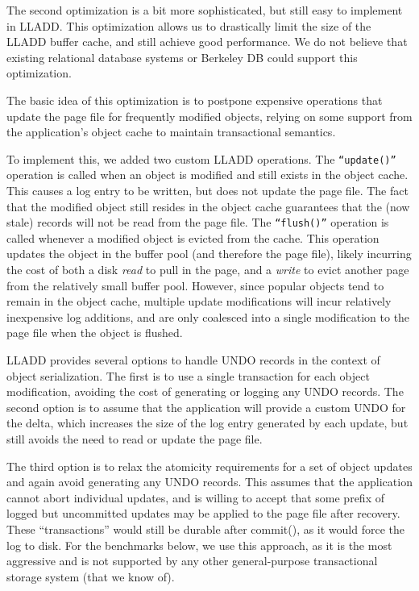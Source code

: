 \documentclass[10pt,letterpaper,twocolumn,english]{article}
\newcommand{\yad}{LLADD\xspace}
\begin{document}

The second optimization is a bit more sophisticated, but still easy to
implement in \yad.  This optimization allows us to drastically limit
the size of the
\yad buffer cache, and still achieve good performance.
We do not believe that existing relational database systems or Berkeley DB could support this optimization.

The basic idea of this optimization is to postpone expensive
operations that update the page file for frequently modified objects,
relying on some support from the application's object cache
to maintain transactional semantics.

To implement this, we added two custom \yad operations. The
{\tt``update()''} operation is called when an object is modified and
still exists in the object cache. This causes a log entry to be
written, but does not update the page file. The fact that the modified
object still resides in the object cache guarantees that the (now stale)
records will not be read from the page file. The {\tt ``flush()''}
operation is called whenever a modified object is evicted from the
cache. This operation updates the object in the buffer pool (and
therefore the page file), likely incurring the cost of both a disk {\em
read} to pull in the page, and a {\em write} to evict another page
from the relatively small buffer pool.  However, since popular 
objects tend to remain in the object cache, multiple update
modifications will incur relatively inexpensive log additions,
and are only coalesced into a single modification to the page file
when the object is flushed.

\yad provides several options  to handle UNDO records in the context
of object serialization. The first is to use a single transaction for
each object modification, avoiding the cost of generating or logging
any UNDO records. The second option is to assume that the
application will provide a custom UNDO for the delta, 
which increases the size of the log entry generated by each update, 
but still avoids the need to read or update the page
file.

The third option is to relax the atomicity requirements for a set of
object updates and again avoid generating any UNDO records. This
assumes that the application cannot abort individual updates, 
and is willing to
accept that some prefix of logged but uncommitted updates may 
be applied to the page
file after recovery. These ``transactions'' would still be durable
after commit(), as it would force the log to disk. 
For the benchmarks below, we
use this approach, as it is the most aggressive and is
not supported by any other general-purpose transactional 
storage system (that we know of).
\end{document}
